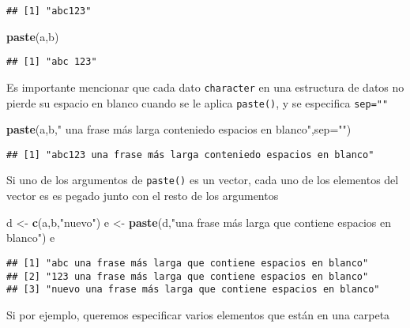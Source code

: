 \documentclass[]{article}
\newenvironment{Shaded}{\begin{snugshade}}{\end{snugshade}}
\newcommand{\KeywordTok}[1]{\textcolor[rgb]{0.13,0.29,0.53}{\textbf{#1}}}
\newcommand{\DataTypeTok}[1]{\textcolor[rgb]{0.13,0.29,0.53}{#1}}
\newcommand{\StringTok}[1]{\textcolor[rgb]{0.31,0.60,0.02}{#1}}
\newcommand{\NormalTok}[1]{#1}
\begin{document}
\begin{verbatim}
## [1] "abc123"
\end{verbatim}

\begin{Shaded}
\begin{Highlighting}[]
\KeywordTok{paste}\NormalTok{(a,b)}
\end{Highlighting}
\end{Shaded}

\begin{verbatim}
## [1] "abc 123"
\end{verbatim}

Es importante mencionar que cada dato \texttt{character} en una
estructura de datos no pierde su espacio en blanco cuando se le aplica
\texttt{paste()}, y se especifica \texttt{sep=""}

\begin{Shaded}
\begin{Highlighting}[]
\KeywordTok{paste}\NormalTok{(a,b,}\StringTok{" una frase más larga conteniedo espacios en blanco"}\NormalTok{,}\DataTypeTok{sep=}\StringTok{""}\NormalTok{)}
\end{Highlighting}
\end{Shaded}

\begin{verbatim}
## [1] "abc123 una frase más larga conteniedo espacios en blanco"
\end{verbatim}

Si uno de los argumentos de \texttt{paste()} es un vector, cada uno de
los elementos del vector es es pegado junto con el resto de los
argumentos

\begin{Shaded}
\begin{Highlighting}[]
\NormalTok{d <-}\StringTok{ }\KeywordTok{c}\NormalTok{(a,b,}\StringTok{"nuevo"}\NormalTok{)}
\NormalTok{e <-}\StringTok{ }\KeywordTok{paste}\NormalTok{(d,}\StringTok{"una frase más larga que contiene espacios en blanco"}\NormalTok{)}
\NormalTok{e}
\end{Highlighting}
\end{Shaded}

\begin{verbatim}
## [1] "abc una frase más larga que contiene espacios en blanco"  
## [2] "123 una frase más larga que contiene espacios en blanco"  
## [3] "nuevo una frase más larga que contiene espacios en blanco"
\end{verbatim}

Si por ejemplo, queremos especificar varios elementos que están en una
carpeta
\end{document}
